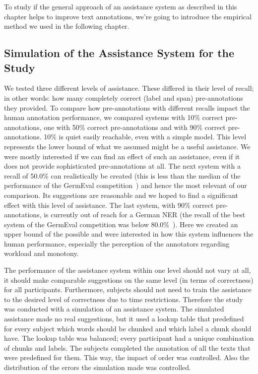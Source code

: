 		To study if the general approach of an assistance system as described in this chapter helps to improve text annotations, we're going to introduce the empirical method we used in the following chapter.

	\subsection{Simulation of the Assistance System for the Study} %
		\label{sec:simulationOfTheAssistanceSystem}

		We tested three different levels of assistance. These differed in their level of recall; in other words: how many completely correct (label and span) pre-annotations they provided. To compare how pre-annotations with different recalls impact the human annotation performance, we compared systems with 10\% correct pre-annotations, one with 50\% correct pre-annotations and with 90\% correct pre-annotations. 10\% is quiet easily reachable, even with a simple model. This level represents the lower bound of what we assumed might be a useful assistance. We were mostly interested if we can find an effect of such an assistance, even if it does not provide sophisticated pre-annotations at all. The next system with a recall of 50.0\% can realistically be created (this is less than the median of the performance of the GermEval competition~\cite{benikova2014germeval}) and hence the most relevant of our comparison. Its suggestions are reasonable and we hoped to find a significant effect with this level of assistance. The last system, with 90\% correct pre-annotations, is currently out of reach for a German \ac{NER} (the recall of the best system of the GermEval competition was below 80.0\%~\cite{benikova2014germeval}). Here we created an upper bound of the possible and were interested in how this system influences the human performance, especially the perception of the annotators regarding workload and monotony.

		The performance of the assistance system within one level should not vary at all, it should make comparable suggestions on the same level (in terms of correctness) for all participants. Furthermore, subjects should not need to train the assistance to the desired level of correctness due to time restrictions. Therefore the study was conducted with a simulation of an assistance system. The simulated assistance made no real suggestions, but it used a lookup table that predefined for every subject which words should be chunked and which label a chunk should have. The lookup table was balanced; every participant had a unique combination of chunks and labels. The subjects completed the annotation of all the texts that were predefined for them. This way, the impact of order was controlled. Also the distribution of the errors the simulation made was controlled.

